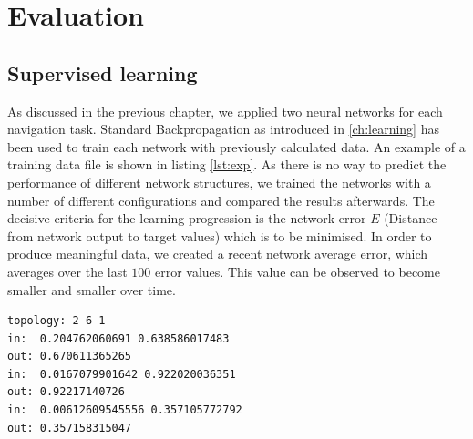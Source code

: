 \documentclass[10pt,a4paper,DIV=11]{scrreprt}
\begin{document}
\chapter{Evaluation}
\label{ch:eval}

\section{Supervised learning}

As discussed in the previous chapter, we applied two neural networks for each navigation task. Standard Backpropagation as introduced in \ref{ch:learning} has been used
to train each network with previously calculated data. An example of a training data file is shown in listing \ref{lst:exp}. As there is no way to predict the performance 
of different network structures, we trained the networks with a number of different configurations and compared the results afterwards. The decisive criteria for the
learning progression is the network error $E$ (Distance from network output to target values) which is to be minimised. In order to produce meaningful data, we created
a recent network average error, which averages over the last $100$ error values. This value can be observed to become smaller and smaller over time. 

\begin{lstlisting}[caption={An example of data used to train $net_v$ with Backpropagation.},label={lst:exp},stepnumber=1]
topology: 2 6 1
in:  0.204762060691 0.638586017483
out: 0.670611365265
in:  0.0167079901642 0.922020036351
out: 0.92217140726
in:  0.00612609545556 0.357105772792
out: 0.357158315047
\end{lstlisting}
\end{document}
